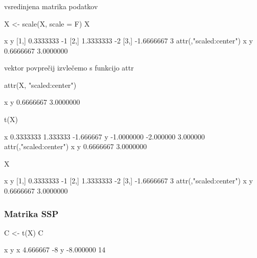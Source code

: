 \begin{frame}[fragile]
\frametitle{}
vsredinjena matrika podatkov
\begin{Schunk}
\begin{Sinput}
 X <- scale(X, scale = F)
 X
\end{Sinput}
\begin{Soutput}
              x  y
[1,]  0.3333333 -1
[2,]  1.3333333 -2
[3,] -1.6666667  3
attr(,"scaled:center")
        x         y 
0.6666667 3.0000000 
\end{Soutput}
\end{Schunk}
vektor povprečij izvlečemo s funkcijo attr
\begin{Schunk}
\begin{Sinput}
 attr(X, "scaled:center")
\end{Sinput}
\begin{Soutput}
        x         y 
0.6666667 3.0000000 
\end{Soutput}
\end{Schunk}
\end{frame}

\begin{Schunk}
\begin{Sinput}
 t(X)
\end{Sinput}
\begin{Soutput}
        [,1]      [,2]      [,3]
x  0.3333333  1.333333 -1.666667
y -1.0000000 -2.000000  3.000000
attr(,"scaled:center")
        x         y 
0.6666667 3.0000000 
\end{Soutput}
\begin{Sinput}
 X
\end{Sinput}
\begin{Soutput}
              x  y
[1,]  0.3333333 -1
[2,]  1.3333333 -2
[3,] -1.6666667  3
attr(,"scaled:center")
        x         y 
0.6666667 3.0000000 
\end{Soutput}
\end{Schunk}



\begin{frame}[fragile]
\frametitle{Matrika SSP}
\begin{Schunk}
\begin{Sinput}
 C <- t(X) %*% X
 C
\end{Sinput}
\begin{Soutput}
          x  y
x  4.666667 -8
y -8.000000 14
\end{Soutput}
\end{Schunk}
\end{frame}



